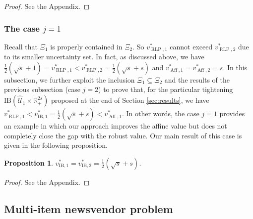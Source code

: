 \documentclass[12pt]{article}
\DeclareMathOperator{\AR}{RLP}
\DeclareMathOperator{\AP}{Aff}
\newtheorem{proposition}{Proposition}
\newcommand{\K}{\widehat{\mathcal{U}}}
\newcommand{\IB}{\mathrm{IB}}
\def\RR{{\mathbb{R}}}
\begin{document}
\begin{onehalfspace}
\begin{proof}
See the Appendix. 
\end{proof}

\subsubsection{The case $j=1$} \label{ssec:example2}

Recall that $\Xi_1$ is properly contained in $\Xi_2$. So $v_{\AR,1}^*$
cannot exceed $v_{\AR,2}^*$ due to its smaller uncertainty set. In
fact, as discussed above, we have
$\tfrac12(\sqrt{s} + 1) = v_{\AR,1}^* < v^*_{\AR,2} = \tfrac12(\sqrt{s}
+ s)$ and $v^*_{\AP,1} = v^*_{\AP,2} = s$. In this subsection, we
further exploit the inclusion $\Xi_1 \subseteq \Xi_2$ and the results
of the previous subsection (case $j=2$) to prove that, for the
particular tightening $\IB(\K_1 \times \RR_+^{2s})$ proposed at the end
of Section \ref{sec:results}, we have $v_{\AR,1}^* < v_{\IB,1}^* =
\tfrac12(\sqrt{s} + s) < v^*_{\AP,1}$. In other words, the case $j=1$
provides an example in which our approach improves the affine value but
does not completely close the gap with the robust value.
Our main result of this case is given in the following proposition. 

\begin{proposition} \label{prop:case1}
$v_{\IB,1}^* = v_{\IB,2}^* = \tfrac12(\sqrt{s} + s)$.
\end{proposition}

\begin{proof}
See the Appendix. 
\end{proof}

\subsection{Multi-item newsvendor problem} \label{ssec:newsvendor}


\end{onehalfspace}
\end{document}
